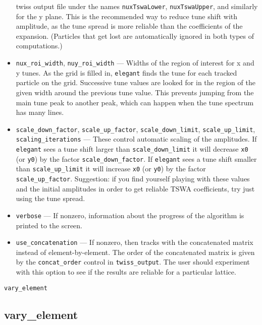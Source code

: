 \documentclass[11pt]{article}
\begin{document}
\begin{itemize}
        twiss output file under the names \verb|nuxTswaLower|, \verb|nuxTswaUpper|, and
        similarly for the y plane.  This is the recommended way to reduce tune shift
        with amplitude, as the tune spread is more reliable than the coefficients of 
        the expansion.  (Particles that get lost are automatically ignored in both
        types of computations.)
\item \verb|nux_roi_width|, \verb|nuy_roi_width| --- Widths of the region of interest for
        x and y tunes.  As the grid is filled in, {\tt elegant} finds the tune for each
        tracked particle on the grid.  Successive tune values are looked for in the
        region of the given width around the previous tune value.  This prevents jumping
        from the main tune peak to another peak, which can happen when the tune spectrum
        has many lines.
\item \verb|scale_down_factor|, \verb|scale_up_factor|, \verb|scale_down_limit|, 
        \verb|scale_up_limit|, \verb|scaling_iterations| --- These control automatic scaling
        of the amplitudes.  If {\tt elegant} sees a tune shift larger than \verb|scale_down_limit|
        it will decrease \verb|x0| (or \verb|y0|) by the factor \verb|scale_down_factor|. 
        If  {\tt elegant} sees a tune shift smaller than \verb|scale_up_limit|
        it will increase \verb|x0| (or \verb|y0|) by the factor \verb|scale_up_factor|. 
        Suggestion: if you find yourself playing with these values and the initial amplitudes
        in order to get reliable TSWA coefficients, try just using the tune spread.
\item \verb|verbose| --- If nonzero, information about the progress of the algorithm is 
        printed to the screen.
\item \verb|use_concatenation| --- If nonzero, then tracks with the concatenated matrix instead
        of element-by-element.  The order
        of the concatenated matrix is given by the \verb|concat_order| control in
        \verb|twiss_output|. The user should experiment with this option to see if the
        results are reliable for a particular lattice.
\end{itemize}

\newpage
\begin{center}{\Large\verb|vary_element|}\end{center}
\subsection{vary\_element \label{subsec:varyelement}}
\end{document}
